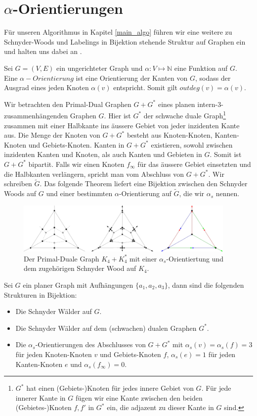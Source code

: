 \section{$\alpha$-Orientierungen}\label{alpha_orientations}

Für unseren Algorithmus in Kapitel \ref{main_algo} führen wir eine weitere zu Schnyder-Woods und Labelings in Bijektion stehende Struktur auf Graphen ein und halten uns dabei an \cite{felsner04}.

Sei $G=(V,E)$ ein ungerichteter Graph und $\alpha:V\mapsto\mathbb{N}$ eine Funktion auf $G$. Eine $\alpha-Orientierung$ ist eine Orientierung der Kanten von $G$, sodass der Ausgrad eines jeden Knoten $\alpha(v)$ entspricht. Somit gilt $outdeg(v) = \alpha(v).$

Wir betrachten den Primal-Dual Graphen $G+G^*$ eines planen intern-3-zusam\allowbreak men\allowbreak hängenden Graphen $G$. Hier ist $G^*$ der schwache duale Graph\footnote{$G^*$ hat einen (Gebiets-)Knoten für jedes innere Gebiet von $G$. Für jede innerer Kante in $G$ fügen wir eine Kante zwischen den beiden (Gebietes-)Knoten $f,f'$ in $G^*$ ein, die adjazent zu dieser Kante in $G$ sind.} zusammen mit einer Halbkante ins äussere Gebiet von jeder inzidenten Kante aus. Die Menge der Knoten von $G+G^*$ besteht aus Knoten-Knoten, Kanten-Knoten und Gebiets-Knoten. Kanten in $G+G^*$ existieren, sowohl zwischen inzidenten Kanten und Knoten, als auch Kanten und Gebieten in $G$. Somit ist $G+G^*$ bipartit. Falls wir einen Knoten $f_\infty$ für das äussere Gebiet einsetzten und die Halbkanten verlängern, spricht man vom Abschluss von $G+G^*$. Wir schreiben $\tilde{G}$. Das folgende Theorem liefert eine Bijektion zwischen den Schnyder Woods auf $G$ und einer bestimmten $\alpha$-Orientierung auf $\tilde{G}$, die wir $\alpha_s$ nennen.

\begin{figure}
	\centering
  \includegraphics[width=0.95\textwidth]{alpha_ex.png}
  \caption{Der Primal-Duale Graph $K_4+K_4^*$ mit einer $\alpha_s$-Orientiertung und dem zugehörigen Schnyder Wood auf $K_4$. }
\end{figure}

\begin{theorem}\label{alpha_bij}
Sei $G$ ein planer Graph mit Aufhängungen $\{a_1,a_2,a_3\}$, dann sind die folgenden Strukturen in Bijektion:
\begin{itemize}
\item Die Schnyder Wälder auf $G$.
\item Die Schnyder Wälder auf dem (schwachen) dualen Graphen $G^*$.
\item Die $\alpha_{s}$-Orientierungen des Abschlusses von $G+G^*$ mit $\alpha_s(v) = \alpha_s(f) = 3$ für jeden Knoten-Knoten $v$ und Gebiets-Knoten $f$,  $\alpha_s(e) = 1$ für jeden Kanten-Knoten $e$ und  $\alpha_s(f_\infty) = 0$.
\end{itemize}
\end{theorem}
